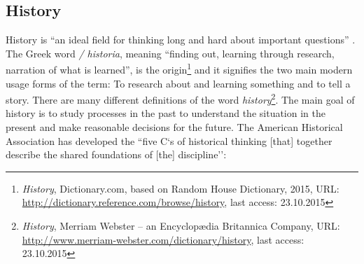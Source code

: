 \subsection{History} %
\label{sub:history}

History is ``an ideal field for thinking long and hard about important questions''
\cite{ahaFiveCs}.
The Greek word \emph{\textIota\textsigma\texttau\textomikron\textrho\textiota\textalpha / historia}, meaning ``finding out, learning through research, narration of what is learned'', is the origin\footnote{
  \textit{History},
  Dictionary.com, based on Random House Dictionary, 2015,
  URL: \url{http://dictionary.reference.com/browse/history},
  last access: 23.10.2015
}
and it signifies the two main modern usage forms of the term: To research about and learning something and to tell a story. There are many different definitions of the word \emph{history}\footnote{
  \textit{History},
  Merriam Webster -- an Encyclopædia Britannica Company,
  URL: \url{http://www.merriam-webster.com/dictionary/history},
  last access: 23.10.2015
}.
The main goal of history is to study processes in the past to understand the situation in the present and make reasonable decisions for the future. The American Historical Association has developed the ``five C`s of historical thinking [that] together describe the shared foundations of [the] discipline''\cite{ahaFiveCs}:

